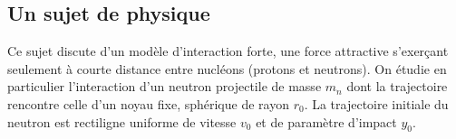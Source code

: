




\subsection{Un sujet de physique}
Ce sujet discute d’un modèle d’interaction forte, une force attractive s’exerçant seulement à courte distance entre
nucléons (protons et neutrons). On étudie en particulier l’interaction d’un neutron projectile de masse $m_n$ dont la trajectoire rencontre celle d’un noyau fixe, sphérique de rayon $r_0$. La trajectoire initiale du neutron est rectiligne uniforme de vitesse $v_0$ et de paramètre d’impact $y_0$.

